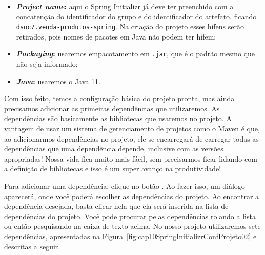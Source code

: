 \begin{itemize}
\begin{itemize}
        \item \textbf{\textit{Project name}:} aqui o Spring Initializr já deve ter preenchido com a concatenção do identificador do grupo e do identificador do artefato, ficando \texttt{dsoc7.venda-produtos-spring}. Na criação do projeto esses hífens serão retirados, pois nomes de pacotes em Java não podem ter hífem;
        
        \item \textbf{\textit{Packaging}:} usaremos empacotamento em \texttt{.jar}, que é o padrão mesmo que não seja informado;
        
        \item \textbf{\textit{Java}:} usaremos o Java 11.
        
    \end{itemize}
\end{itemize}

Com isso feito, temos a configuração básica do projeto pronta, mas ainda precisamos adicionar as primeiras dependências que utilizaremos. As dependências são basicamente as bibliotecas que usaremos no projeto. A vantagem de usar um sistema de gerenciamento de projetos como o Maven é que, ao adicionarmos dependências no projeto, ele se encarregará de carregar todas as dependências que uma dependência depende, inclusive com as versões apropriadas! Nossa vida fica muito mais fácil, sem precisarmos ficar lidando com a definição de bibliotecas e isso é um super avanço na produtividade!

Para adicionar uma dependência, clique no botão . Ao fazer isso, um diálogo aparecerá, onde você poderá escolher as dependências do projeto. Ao encontrar a dependência desejada, basta clicar nela que ela será inserida na lista de dependências do projeto. Você pode procurar pelas dependências rolando a lista ou então pesquisando na caixa de texto acima. No nosso projeto utilizaremos sete dependências, apresentadas na Figura~\ref{fig:cap10SpringInitializrConfProjeto02} e descritas a seguir.

